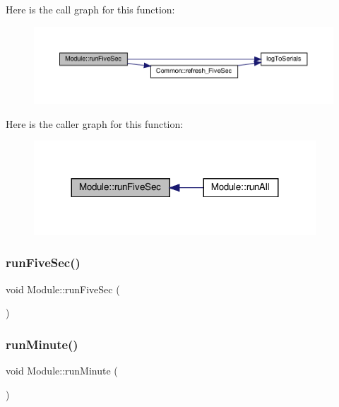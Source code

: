Here is the call graph for this function\+:
\nopagebreak
\begin{figure}[H]
\begin{center}
\leavevmode
\includegraphics[width=350pt]{class_module_adb37fcc3cf7c1a693e5b6e92a873bf72_cgraph}
\end{center}
\end{figure}
Here is the caller graph for this function\+:
\nopagebreak
\begin{figure}[H]
\begin{center}
\leavevmode
\includegraphics[width=299pt]{class_module_adb37fcc3cf7c1a693e5b6e92a873bf72_icgraph}
\end{center}
\end{figure}
\mbox{\label{class_module_adb37fcc3cf7c1a693e5b6e92a873bf72}} 
\subsubsection{\texorpdfstring{run\+Five\+Sec()}{runFiveSec()}\hspace{0.1cm}{\footnotesize\ttfamily [2/2]}}
{\footnotesize\ttfamily void Module\+::run\+Five\+Sec (\begin{DoxyParamCaption}{ }\end{DoxyParamCaption})}

\mbox{\label{class_module_aa13cfb83b001955abfeb3b87789a7ab8}} 
\subsubsection{\texorpdfstring{run\+Minute()}{runMinute()}\hspace{0.1cm}{\footnotesize\ttfamily [1/2]}}
{\footnotesize\ttfamily void Module\+::run\+Minute (\begin{DoxyParamCaption}{ }\end{DoxyParamCaption})}



